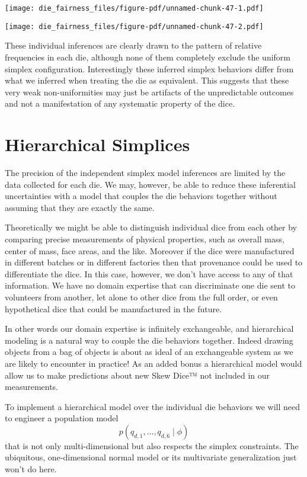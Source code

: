 \documentclass[
  letterpaper,
  DIV=11,
  numbers=noendperiod]{scrartcl}
\begin{document}
\texttt{[image: die\_fairness\_files/figure-pdf/unnamed-chunk-47-1.pdf]}

\texttt{[image: die\_fairness\_files/figure-pdf/unnamed-chunk-47-2.pdf]}

These individual inferences are clearly drawn to the pattern of relative
frequencies in each die, although none of them completely exclude the
uniform simplex configuration. Interestingly these inferred simplex
behaviors differ from what we inferred when treating the die as
equivalent. This suggests that these very weak non-uniformities may just
be artifacts of the unpredictable outcomes and not a manifestation of
any systematic property of the dice.

\section{Hierarchical Simplices}\label{hierarchical-simplices}

The precision of the independent simplex model inferences are limited by
the data collected for each die. We may, however, be able to reduce
these inferential uncertainties with a model that couples the die
behaviors together without assuming that they are exactly the same.

Theoretically we might be able to distinguish individual dice from each
other by comparing precise measurements of physical properties, such as
overall mass, center of mass, face areas, and the like. Moreover if the
dice were manufactured in different batches or in different factories
then that provenance could be used to differentiate the dice. In this
case, however, we don't have access to any of that information. We have
no domain expertise that can discriminate one die sent to volunteers
from another, let alone to other dice from the full order, or even
hypothetical dice that could be manufactured in the future.

In other words our domain expertise is infinitely exchangeable, and
hierarchical modeling is a natural way to couple the die behaviors
together. Indeed drawing objects from a bag of objects is about as ideal
of an exchangeable system as we are likely to encounter in practice! As
an added bonus a hierarchical model would allow us to make predictions
about new Skew Dice™ not included in our measurements.

To implement a hierarchical model over the individual die behaviors we
will need to engineer a population model \[
p( q_{d, 1}, \ldots, q_{d, 6} \mid \phi )
\] that is not only multi-dimensional but also respects the simplex
constraints. The ubiquitous, one-dimensional normal model or its
multivariate generalization just won't do here.
\end{document}

